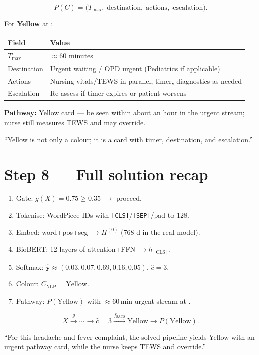 \[
  P(C) = \bigl(T_{\max},\;\mathrm{destination},\;\mathrm{actions},\;\mathrm{escalation}\bigr).
\]

For \textbf{Yellow} at \examplehospital{}:

\begin{center}
\begin{tabular}{@{}lp{9cm}@{}}
\toprule
Field & Value \\
\midrule
\(T_{\max}\) & \(\approx 60\) minutes \\
Destination & Urgent waiting / OPD urgent (Pediatrics if applicable) \\
Actions & Nursing vitals/TEWS in parallel, timer, diagnostics as needed \\
Escalation & Re-assess if timer expires or patient worsens \\
\bottomrule
\end{tabular}
\end{center}

\begin{resultbox}
\textbf{Pathway:} Yellow card --- be seen within about an hour in the urgent stream;
nurse still measures TEWS and may override.
\end{resultbox}

\begin{saybox}
``Yellow is not only a colour; it is a card with timer, destination, and escalation.''
\end{saybox}

\section{Step 8 --- Full solution recap}
\label{sec:recap}

\begin{resultbox}
\begin{enumerate}[leftmargin=*,itemsep=0.35em]
  \item Gate: \(g(X)=0.75 \ge 0.35\) \(\to\) proceed.
  \item Tokenise: WordPiece IDs with \texttt{[CLS]}/\texttt{[SEP]}/pad to \(128\).
  \item Embed: word+pos+seg \(\to H^{(0)}\) (768-d in the real model).
  \item BioBERT: 12 layers of attention+FFN \(\to h_{\mathrm{[CLS]}}\).
  \item Softmax: \(\hat{\mathbf{y}}\approx(0.03,0.07,0.69,0.16,0.05)\), \(\hat{c}=3\).
  \item Colour: \(C_{\mathrm{NLP}}=\mathrm{Yellow}\).
  \item Pathway: \(P(\mathrm{Yellow})\) with \(\approx 60\)\,min urgent stream at \examplehospital{}.
\end{enumerate}
\[
  X \xrightarrow{g} \cdots \to \hat{c}=3
  \xrightarrow{f_{\mathrm{SATS}}} \mathrm{Yellow}
  \to P(\mathrm{Yellow}).
\]
\end{resultbox}

\begin{saybox}
``For this headache-and-fever complaint, the solved pipeline yields Yellow with an urgent pathway card, while the nurse keeps TEWS and override.''
\end{saybox}
